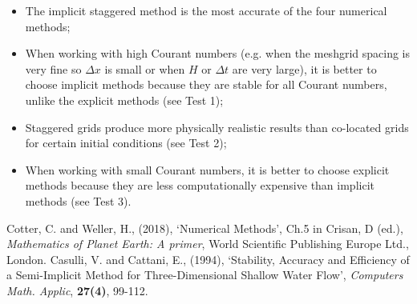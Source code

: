\documentclass[a4paper, 10.5pt, notitlepage]{article}
\begin{document}
\begin{itemize}
	\item The implicit staggered method is the most accurate of the four numerical methods;
	\item When working with high Courant numbers (e.g. when the meshgrid spacing is very fine so $\Delta x$ is small or when $H$ or $\Delta t$ are very large), it is better to choose implicit methods because they are stable for all Courant numbers, unlike the explicit methods (see Test 1);
	\item Staggered grids produce more physically realistic results than co-located grids for certain initial conditions (see Test 2);
	\item When working with small Courant numbers, it is better to choose explicit methods because they are less computationally expensive than implicit methods (see Test 3).
\end{itemize}


\begin{thebibliography}{9}
	Cotter, C. and Weller, H., (2018), \textquoteleft Numerical Methods\textquoteright, Ch.5 in Crisan, D (ed.), \textit{Mathematics of Planet Earth: A primer}, World Scientific Publishing Europe Ltd., London.
	Casulli, V. and Cattani, E., (1994), \textquoteleft Stability, Accuracy and Efficiency of a Semi-Implicit Method for Three-Dimensional Shallow Water Flow\textquoteright, \textit{Computers Math. Applic}, \textbf{27(4)}, 99-112.
\end{thebibliography}
\end{document}
